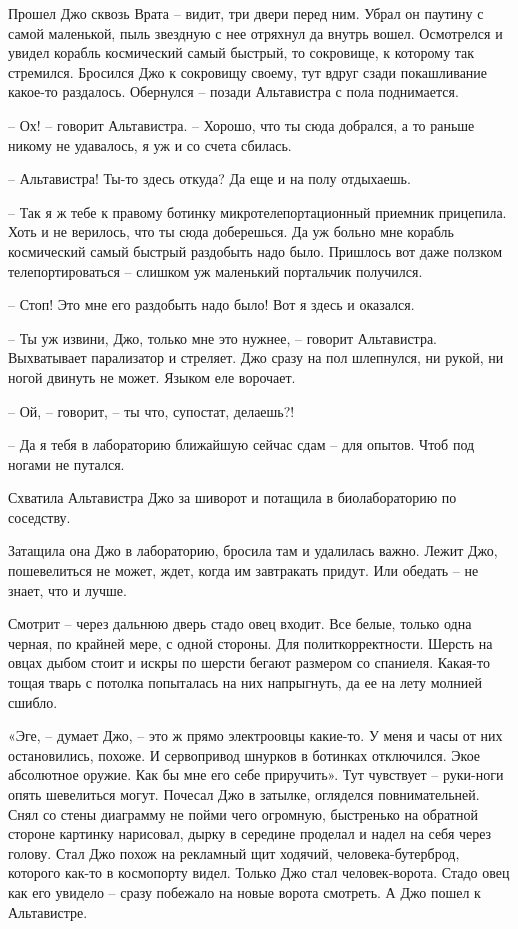 \documentclass[ebook,oneside,final,openright]{memoir}
\begin{document}
\par
\par
Прошел Джо сквозь Врата – видит, три двери перед ним. Убрал он паутину с самой маленькой, пыль звездную с нее отряхнул да внутрь вошел. Осмотрелся и увидел корабль космический самый быстрый, то сокровище, к которому так стремился. Бросился Джо к сокровищу своему, тут вдруг сзади покашливание какое-то раздалось. Обернулся – позади Альтавистра с пола поднимается.\par
– Ох! – говорит Альтавистра. – Хорошо, что ты сюда добрался, а то раньше никому не удавалось, я уж и со счета сбилась.\par
– Альтавистра! Ты-то здесь откуда? Да еще и на полу отдыхаешь.\par
– Так я ж тебе к правому ботинку микротелепортационный приемник прицепила. Хоть и не верилось, что ты сюда доберешься. Да уж больно мне корабль космический самый быстрый раздобыть надо было. Пришлось вот даже ползком телепортироваться – слишком уж маленький портальчик получился.\par
– Стоп! Это мне его раздобыть надо было! Вот я здесь и оказался.\par
– Ты уж извини, Джо, только мне это нужнее, – говорит Альтавистра. Выхватывает парализатор и стреляет. Джо сразу на пол шлепнулся, ни рукой, ни ногой двинуть не может. Языком еле ворочает.\par
– Ой, – говорит, – ты что, супостат, делаешь?!\par
– Да я тебя в лабораторию ближайшую сейчас сдам – для опытов. Чтоб под ногами не путался.\par
Схватила Альтавистра Джо за шиворот и потащила в биолабораторию по соседству.\par
\par
Затащила она Джо в лабораторию, бросила там и удалилась важно. Лежит Джо, пошевелиться не может, ждет, когда им завтракать придут. Или обедать – не знает, что и лучше. \par
Смотрит – через дальнюю дверь стадо овец входит. Все белые, только одна черная, по крайней мере, с одной стороны. Для политкорректности. Шерсть на овцах дыбом стоит и искры по шерсти бегают размером со спаниеля. Какая-то тощая тварь с потолка попыталась на них напрыгнуть, да ее на лету молнией сшибло.\par
\par
«Эге, – думает Джо, – это ж прямо электроовцы какие-то. У меня и часы от них остановились, похоже. И сервопривод шнурков в ботинках отключился. Экое абсолютное оружие. Как бы мне его себе приручить». Тут чувствует – руки-ноги опять шевелиться могут. Почесал Джо в затылке, огляделся повнимательней. Снял со стены диаграмму не пойми чего огромную, быстренько на обратной стороне картинку нарисовал, дырку в середине проделал и надел на себя через голову. Стал Джо похож на рекламный щит ходячий, человека-бутерброд, которого как-то в космопорту видел. Только Джо стал человек-ворота. Стадо овец как его увидело – сразу побежало на новые ворота смотреть. А Джо пошел к Альтавистре.\par
\end{document}
